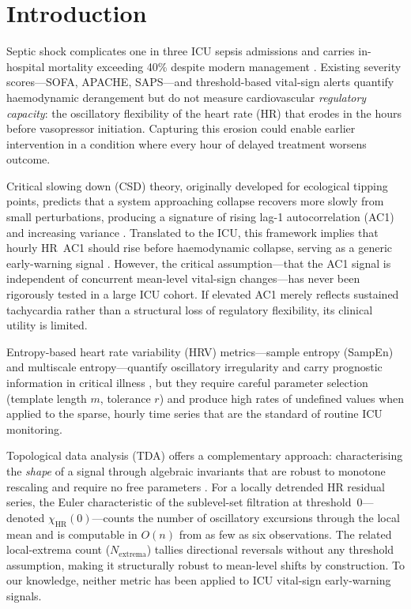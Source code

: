 \documentclass[12pt,a4paper]{article}
\begin{document}
\section{Introduction}
\label{sec:intro}
Septic shock complicates one in three ICU sepsis admissions and carries
in-hospital mortality exceeding 40\% despite modern management
\citep{singer2016}.
Existing severity scores---SOFA, APACHE, SAPS---and threshold-based
vital-sign alerts quantify haemodynamic derangement but do not measure
cardiovascular \emph{regulatory capacity}: the oscillatory flexibility of
the heart rate (HR) that erodes in the hours before vasopressor initiation.
Capturing this erosion could enable earlier intervention in a condition
where every hour of delayed treatment worsens outcome.

Critical slowing down (CSD) theory, originally developed for ecological
tipping points, predicts that a system approaching collapse recovers more
slowly from small perturbations, producing a signature of rising lag-1
autocorrelation (AC1) and increasing variance \citep{scheffer2009,dakos2012}.
Translated to the ICU, this framework implies that hourly HR~AC1 should
rise before haemodynamic collapse, serving as a generic early-warning signal
\citep{olderikkert2016,khalil2025}.
However, the critical assumption---that the AC1 signal is independent of
concurrent mean-level vital-sign changes---has never been rigorously tested
in a large ICU cohort.
If elevated AC1 merely reflects sustained tachycardia rather than a
structural loss of regulatory flexibility, its clinical utility is limited.

Entropy-based heart rate variability (HRV) metrics---sample entropy (SampEn)
and multiscale entropy---quantify oscillatory irregularity and carry
prognostic information in critical illness \citep{moorman2011,lake2002,bravi2012},
but they require careful parameter selection (template length $m$, tolerance $r$)
and produce high rates of undefined values when applied to the sparse,
hourly time series that are the standard of routine ICU monitoring.

Topological data analysis (TDA) offers a complementary approach:
characterising the \emph{shape} of a signal through algebraic invariants
that are robust to monotone rescaling and require no free parameters
\citep{edelsbrunner2010}.
For a locally detrended HR residual series, the Euler characteristic of the
sublevel-set filtration at threshold~0---denoted $\chi_{\text{HR}}(0)$---counts
the number of oscillatory excursions through the local mean and is computable
in $O(n)$ from as few as six observations.
The related local-extrema count ($N_{\text{extrema}}$) tallies directional
reversals without any threshold assumption, making it structurally robust to
mean-level shifts by construction.
To our knowledge, neither metric has been applied to ICU vital-sign
early-warning signals.
\end{document}
